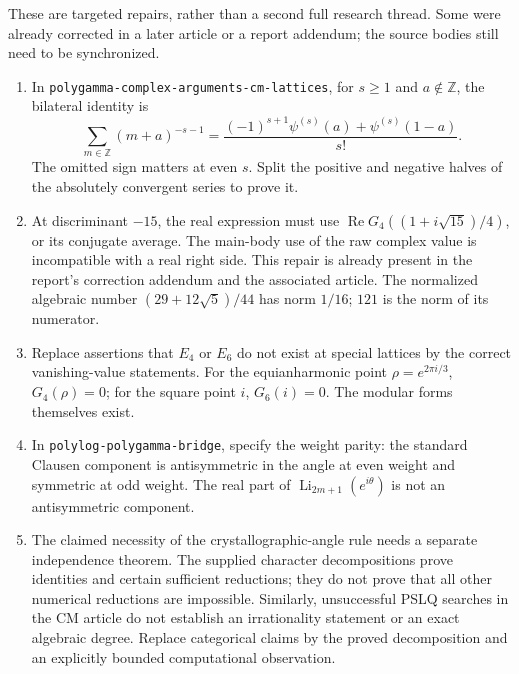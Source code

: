 \documentclass[11pt]{article}
\numberwithin{equation}{section}
\theoremstyle{definition}
\theoremstyle{remark}
\newcommand{\Z}{\mathbb Z}
\DeclareMathOperator{\Li}{Li}
\DeclareMathOperator{\Rea}{Re}
\begin{document}
These are targeted repairs, rather than a second full research thread.
Some were already corrected in a later article or a report addendum;
the source bodies still need to be synchronized.

\begin{enumerate}
\item In \texttt{polygamma-complex-arguments-cm-lattices}, for
      $s\ge1$ and $a\notin\Z$, the bilateral identity is
\[
 \sum_{m\in\Z}(m+a)^{-s-1}
 =\frac{(-1)^{s+1}\psi^{(s)}(a)+\psi^{(s)}(1-a)}{s!}.
\]
The omitted sign matters at even $s$. Split the positive and
negative halves of the absolutely convergent series to prove it.

\item At discriminant $-15$, the real expression must use
      $\Rea G_4((1+i\sqrt{15})/4)$, or its conjugate average.
      The main-body use of the raw complex value is incompatible
      with a real right side. This repair is already present in
      the report's correction addendum and the associated article.
      The normalized algebraic number
      $(29+12\sqrt5)/44$ has norm $1/16$; $121$ is the norm of
      its numerator.

\item Replace assertions that $E_4$ or $E_6$ do not exist at special
      lattices by the correct vanishing-value statements.
      For the equianharmonic point $\rho=e^{2\pi i/3}$,
      $G_4(\rho)=0$; for the square point $i$, $G_6(i)=0$.
      The modular forms themselves exist.

\item In \texttt{polylog-polygamma-bridge}, specify the weight
      parity: the standard Clausen component is antisymmetric in
      the angle at even weight and symmetric at odd weight.
      The real part of $\Li_{2m+1}(e^{i\theta})$ is not an
      antisymmetric component.

\item The claimed necessity of the crystallographic-angle rule
      needs a separate independence theorem. The supplied
      character decompositions prove identities and certain
      sufficient reductions; they do not prove that all other
      numerical reductions are impossible. Similarly, unsuccessful
      PSLQ searches in the CM article do not establish an
      irrationality statement or an exact algebraic degree.
      Replace categorical claims by the proved decomposition and
      an explicitly bounded computational observation.
\end{enumerate}
\end{document}
